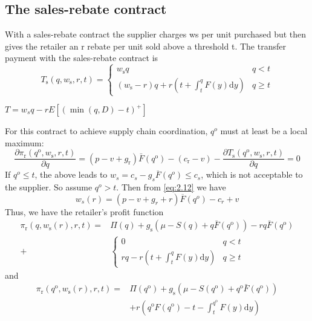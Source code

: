 \subsection{The sales-rebate contract}
With a sales-rebate contract the supplier charges ws per unit purchased
but then gives the retailer an r rebate per unit sold above a threshold t.
The transfer payment with the sales-rebate contract is
$$
T_{\mathrm{s}}\left(q, w_{\mathrm{s}}, r, t\right)= \begin{cases}w_{\mathrm{s}} q & q<t \\ \left(w_{\mathrm{s}}-r\right) q+r\left(t+\int_{t}^{q} F(y) \mathrm{d} y\right) & q \geq t\end{cases}
$$
\begin{note}
    $T=w_s q-r E[\left(\min(q,D)-t\right)^+]$
\end{note}
For this contract to achieve supply chain coordination, $q^{o}$ must at least be a local maximum:
\begin{equation}\label{eq:2.12}
    \frac{\partial \pi_{\mathrm{r}}\left(q^{\mathrm{o}}, w_{\mathrm{s}}, r, t\right)}{\partial q}=\left(p-v+g_{\mathrm{r}}\right) \bar{F}\left(q^{\mathrm{o}}\right)-\left(c_{\mathrm{r}}-v\right)-\frac{\partial T_{\mathrm{s}}\left(q^{\mathrm{o}}, w_{\mathrm{s}}, r, t\right)}{\partial q}=0
\end{equation}
If $q^o\leq t$, the above leads to $w_s=c_s-g_s\overline{F}(q^o)\leq c_s$, which is not acceptable to the supplier. So assume $q^o>t$. Then from \autoref{eq:2.12} we have 
\begin{equation}\label{eq:2.13}
    w_s(r)=(p-v+g_r+r)\overline{F}(q^o)-c_r+v
\end{equation}
Thus, we have the retailer's profit function
$$
\begin{aligned}
\pi_{\mathrm{r}}\left(q, w_{\mathrm{s}}(r), r, t\right)=& \Pi(q)+g_{\mathrm{s}}\left(\mu-S(q)+q \bar{F}\left(q^{\mathrm{o}}\right)\right)-r q \bar{F}\left(q^{\mathrm{o}}\right) \\
+& \begin{cases}0 & q<t \\
r q-r\left(t+\int_{t}^{q} F(y) \mathrm{d} y\right) & q \geq t\end{cases}
\end{aligned}
$$
and
$$
\begin{aligned}
\pi_{\mathrm{r}}\left(q^{\mathrm{o}}, w_{\mathrm{s}}(r), r, t\right)=& \Pi\left(q^{\mathrm{o}}\right)+g_{\mathrm{s}}\left(\mu-S\left(q^{\mathrm{o}}\right)+q^{\mathrm{o}} \bar{F}\left(q^{\mathrm{o}}\right)\right) \\
&+r\left(q^{\mathrm{o}} F\left(q^{\mathrm{o}}\right)-t-\int_{t}^{q^{\mathrm{o}}} F(y) \mathrm{d} y\right)
\end{aligned}
$$
